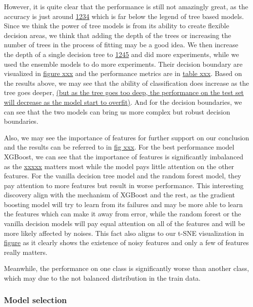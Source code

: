 \documentclass{article}
\begin{document}
However, it is quite clear that the performance is still not amazingly great, as the accuracy is just around \underline{1234} which is far below the legend of tree based models. Since we think the power of tree models is from its ability to create flexible decision areas, we think that adding the depth of the trees or increasing the number of trees in the process of fitting may be a good idea. We then increase the depth of a single decision tree to \underline{1245} and did more experiments,
while we used the ensemble models to do more experiments. Their decision boundary are visualized in \underline{figure xxx} and the performance metrics are in \underline{table xxx}. Based on the results above, we may see that the ability of classification does increase as the tree goes deeper, 
\underline{(but as the tree goes too deep, the performance on the test set will decrease as the model start to overfit)}. 
And for the decision boundaries, we can see that the two models can bring us more complex but robust decision boundaries.



Also, we may see the importance of features for further support on our conclusion and the results can be referred to in \underline{fig xxx}. For the best performance model XGBoost, we can see that the importance of features is significantly imbalanced as the \underline{xxxxx} matters most while the model pays little attention on the other features. For the vanilla decision tree model and the random forest model, they pay attention to more features but result in worse performance. This
interesting discovery align with the mechanism of XGBoost and the rest, as the gradient boosting model will try to learn from its failures and may be more able to learn the features which can make it away from error, while the random forest or the vanilla decision models will pay equal attention on all of the features and will be more likely affected by noises. This fact also aligns to our t-SNE visualization in \underline{figure} as it clearly shows the existence of noisy features and
only a few of features really matters.

Meanwhile, the performance on one class is significantly worse than another class, which may due to the not balanced distribution in the train data.

\subsubsection*{Model selection}
\end{document}
